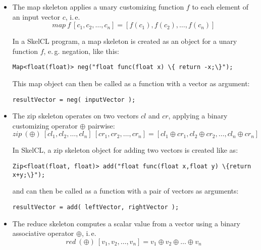 \begin{itemize}
  \item The map skeleton applies a unary customizing function $f$ to each element of an input vector $c$, i.\,e.
    \vspace{-.5em}
    \[ map\ f\ [c_1, c_2, \dots, c_n] = [f(c_1), f(c_2), \dots, f(c_n)] \]

    \vspace{-.5em}
    In a SkelCL program, a map skeleton is created as an object for a unary function $f$, e.\,g. negation, like this:

    \vspace{.5em}
    \centerline{\lstinline!Map<float(float)> neg("float func(float x) \{ return -x;\}");!}
    \vspace{.5em}

    This map object can then be called as a function with a vector as argument:

    \vspace{.5em}
    \centerline{\lstinline!resultVector = neg( inputVector );!}
    \vspace{.5em}
  \item The zip skeleton operates on two vectors $cl$ and $cr$, applying a binary customizing operator $\oplus$ pairwise:
    \vspace{-.5em}
    \[ zip\ (\oplus)\ [cl_1, cl_2, \dots, cl_n]\ [cr_1, cr_2, \dots, cr_n] = [cl_1\oplus cr_1, cl_2\oplus cr_2, \dots, cl_n\oplus cr_n] \]

    \vspace{-.5em}
    In SkelCL, a zip skeleton object for adding two vectors is created like as:

    \vspace{.5em}
    \centerline{\lstinline!Zip<float(float, float)> add("float func(float x,float y) \{return x+y;\}");!}
    \vspace{.5em}

    and can then be called as a function with a pair of vectors as arguments:

    \vspace{.5em}
    \centerline{\lstinline!resultVector = add( leftVector, rightVector );!}
    \vspace{.5em}
    
  \item The reduce skeleton computes a scalar value from a vector using a binary associative operator $\oplus$, i.\,e.
    \vspace{-.5em}
    \[ red\ (\oplus)\ [v_1, v_2, \dots, v_n] = v_1 \oplus v_2 \oplus \dots \oplus v_n \]


\end{itemize}
